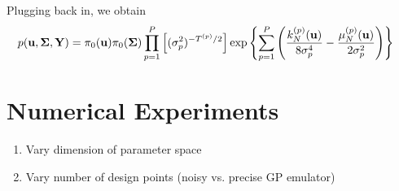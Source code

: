 \documentclass[12pt]{article}
\begin{document}
Plugging back in, we obtain 
\begin{align*}
p(\mathbf{u}, \boldsymbol{\Sigma}, \mathbf{Y}) 
&= \pi_0(\mathbf{u}) \pi_0(\boldsymbol{\Sigma}) \prod_{p=1}^{P} \left[(\sigma^2_{p})^{-{T}^{(p)}/2}\right]
\exp\left\{\sum_{p=1}^{P} \left(\frac{k_{N}^{(p)}(\mathbf{u})}{8\sigma^4_{p}} -
 \frac{\mu_{N}^{(p)}(\mathbf{u})}{2\sigma^2_{p}}\right) \right\}
\end{align*}


\section{Numerical Experiments}
\begin{enumerate}
\item Vary dimension of parameter space
\item Vary number of design points (noisy vs. precise GP emulator)
\end{enumerate}
\end{document}
